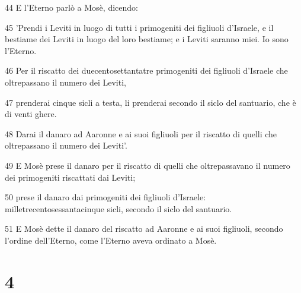 \par 44 E l'Eterno parlò a Mosè, dicendo:
\par 45 'Prendi i Leviti in luogo di tutti i primogeniti dei figliuoli d'Israele, e il bestiame dei Leviti in luogo del loro bestiame; e i Leviti saranno miei. Io sono l'Eterno.
\par 46 Per il riscatto dei duecentosettantatre primogeniti dei figliuoli d'Israele che oltrepassano il numero dei Leviti,
\par 47 prenderai cinque sicli a testa, li prenderai secondo il siclo del santuario, che è di venti ghere.
\par 48 Darai il danaro ad Aaronne e ai suoi figliuoli per il riscatto di quelli che oltrepassano il numero dei Leviti'.
\par 49 E Mosè prese il danaro per il riscatto di quelli che oltrepassavano il numero dei primogeniti riscattati dai Leviti;
\par 50 prese il danaro dai primogeniti dei figliuoli d'Israele: milletrecentosessantacinque sicli, secondo il siclo del santuario.
\par 51 E Mosè dette il danaro del riscatto ad Aaronne e ai suoi figliuoli, secondo l'ordine dell'Eterno, come l'Eterno aveva ordinato a Mosè.

\chapter{4}

